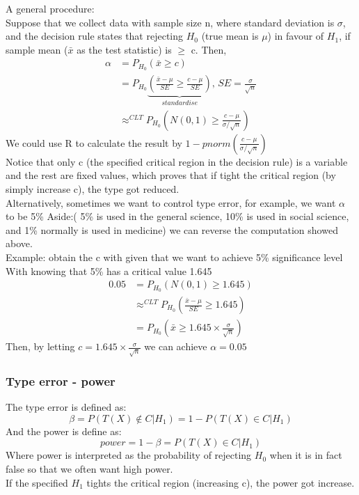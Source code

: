 \documentclass[12pt ]{article}
\newcommand{\RomanNumeralCaps}[1] {\MakeUppercase{\romannumeral #1}}
\begin{document}
A general procedure: \\
Suppose that we collect data with sample size n, where standard deviation is $\sigma$, and the decision rule states that rejecting $H_{0}$ (true mean is $\mu$) in favour of $H_{1}$, if sample mean ($\bar{x}$ as the test statistic) is $\geq$ c. Then,
\begin{align*}
\alpha &= P_{H_{0}}(\bar{x} \geq c) \\
&= P_{H_{0}}\underbrace{(\frac{\bar{x} - \mu}{SE} \geq \frac{c - \mu}{SE})}_{standardise} \text{,   } SE = \frac{\sigma}{\sqrt{n}} \\
& \approx^{CLT}  P_{H_{0}}(N(0,1) \geq \frac{c - \mu}{\sigma / \sqrt{n}})
\end{align*}
We could use R to calculate the result by $1 - pnorm(\frac{c - \mu}{\sigma / \sqrt{n}})$ \\
Notice that only c (the specified critical region in the decision rule) is a variable and the rest are fixed values, which proves that if tight the critical region (by simply increase c), the type \RomanNumeralCaps{1} got reduced.\\

Alternatively, sometimes we want to control type \RomanNumeralCaps{1} error, for example, we want $\alpha$ to be 5\% \color{brown} Aside:( 5\% is used in the general science, 10\% is used in social science, and 1\% normally is used in medicine) \color{black}we can reverse the computation showed above. \\

Example: obtain the c with given that we want to achieve 5\% significance level \\
With knowing that 5\% has a critical value 1.645
\begin{align*}
0.05 &= P_{H_{0}}(N(0,1) \geq 1.645) \\
& \approx^{CLT}  P_{H_{0}} (\frac{\bar{x} - \mu}{SE} \geq 1.645) \\
& = P_{H_{0}} (\bar{x} \geq 1.645 \times \frac{\sigma}{\sqrt{n}})
\end{align*}
Then, by letting $c = 1.645 \times \frac{\sigma}{\sqrt{n}}$ we can achieve $\alpha = 0.05$
\subsubsection{Type \RomanNumeralCaps{2} error - power}
The type \RomanNumeralCaps{2} error is defined as:
\begin{equation*}
\beta = P(T(X) \notin C | H_{1}) = 1 - P(T(X) \in C | H_{1})
\end{equation*}
And the power is define as:
\begin{equation*}
power = 1 - \beta = P(T(X) \in C | H_{1})
\end{equation*}
Where power is interpreted as the probability of rejecting $H_{0}$ when it is in fact false so that we often want high power. \\
If the specified $H_{1}$ tights the critical region (increasing c), the power got increase.
\end{document}

